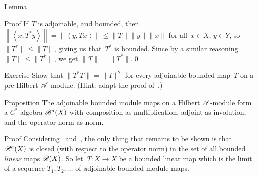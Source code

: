 \documentclass[a]{subfiles}
\begin{document}
\begin{parsec}
\begin{point}{Lemma}
\begin{point}{Proof}
If~$T$ is adjoinable, and bounded,
then~$\left\|\left<x,T^*y\right>\right\|=\left\|\left<y,Tx\right>\right\|
\leq \|T\|\|y\|\|x\|$ for all~$x\in X$, $y\in Y$,
so~$\|T^*\|\leq \|T\|$,
giving us that~$T^*$ is bounded.
Since by a similar reasoning $\|T\|\leq \|T^*\|$,
we get $\|T\|=\|T^*\|$.\qed
\end{point}
\end{point}
\begin{point}{Exercise}%
Show that $\|T^*T\|=\|T\|^2$
for every adjoinable bounded map~$T$ on a pre-Hilbert $\mathscr{A}$-module.
(Hint: adapt the proof of~.)
\end{point}
\begin{point}{Proposition}%
The adjoinable bounded module maps
on a Hilbert $\mathscr{A}$-module
form a $C^*$-algebra%
$\mathscr{B}^a(X)$
with composition as multiplication,
adjoint as involution,
and the operator norm as norm.
\begin{point}{Proof}%
Considering~
and~,
the only thing that remains to be shown is that~$\mathscr{B}^a(X)$
is closed (with respect to the operator norm)
in the set of all bounded \emph{linear} maps $\mathscr{B}(X)$.
So let~$T\colon X\to X$ be a bounded linear map
which is the limit of a sequence $T_1,T_2,\dotsc$
of adjoinable bounded module maps.


\end{point}
\end{point}
\end{parsec}
\end{document}
